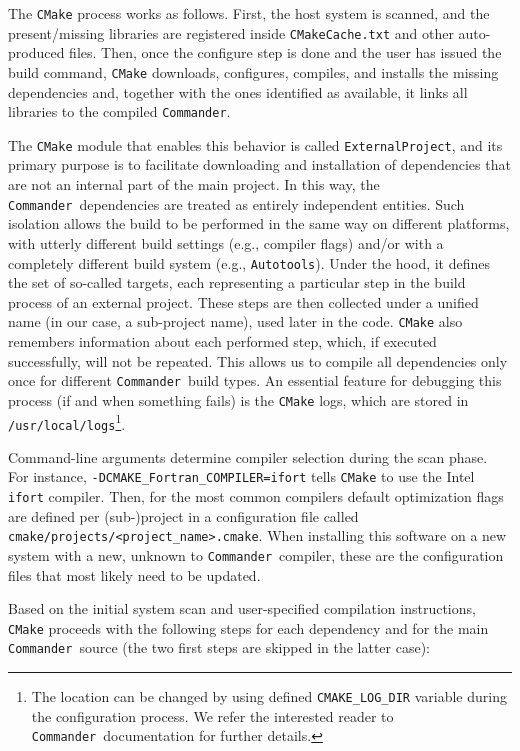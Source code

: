 \documentclass[twocolumn]{openjournal}
\def\commander{\texttt{Commander}}
\begin{document}
The \texttt{CMake} process works as follows. First, the host system is scanned,
and the present/missing  libraries are registered inside
\texttt{CMakeCache.txt} and other auto-produced files. Then, once the configure
step is done and the user has issued the build command, \texttt{CMake}
downloads, configures, compiles, and installs the missing dependencies and,
together with the ones identified as available, it links all libraries to the
compiled \commander.

The \texttt{CMake} module that enables this behavior is called
\texttt{ExternalProject}, and its primary purpose is to facilitate downloading
and installation of dependencies that are not an internal part of the main
project. In this way, the \commander\ dependencies are treated as entirely
independent entities. Such isolation allows the build to be performed in the
same way on different platforms, with utterly different build settings (e.g.,
compiler flags) and/or with a completely different build system (e.g.,
\texttt{Autotools}). Under the hood, it defines the set of so-called targets,
each representing a particular step in the build process of an external
project. These steps are then collected under a unified name (in our case, a
sub-project name), used later in the code. \texttt{CMake} also remembers
information about each performed step, which, if executed successfully, will
not be repeated. This allows us to compile all dependencies only once for
different \commander\ build types. An essential feature for debugging this
process (if and when something fails) is the \texttt{CMake} logs, which are
stored in \texttt{/usr/local/logs}\footnote{The location can be changed by
using defined \texttt{CMAKE\_LOG\_DIR} variable during the configuration
process. We refer the interested reader to \commander\ documentation for
further details.}.

Command-line arguments determine compiler selection during the scan phase. For
instance, \texttt{-DCMAKE\_Fortran\_COMPILER=ifort} tells \texttt{CMake} to use
the Intel \texttt{ifort} compiler. Then, for the most common compilers default
optimization flags are defined per (sub-)project in a configuration file called
\texttt{cmake/projects/{<project\_name>}.cmake}. When installing this software
on a new system with a new, unknown to \commander\, compiler, these are the
configuration files that most likely need to be updated.

Based on the initial system scan and user-specified compilation instructions,
\texttt{CMake} proceeds with the following steps for each dependency and for
the main \commander\ source (the two first steps are skipped in the latter
case):
\end{document}
